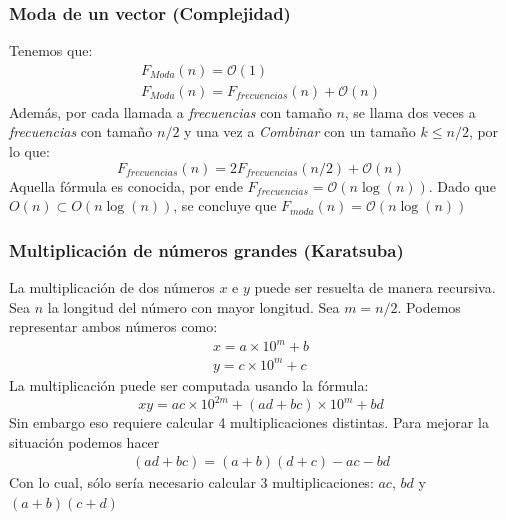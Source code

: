 \documentclass[10pt]{beamer}
\begin{document}
    \begin{frame}
        \frametitle{Moda de un vector (Complejidad)}
        Tenemos que:
        \begin{gather*}
            F_{Moda}(n) = \mathcal{O}(1) \\
            F_{Moda}(n) = F_{frecuencias}(n) + \mathcal{O}(n)
        \end{gather*}
        Además, por cada llamada a \textit{frecuencias} con tamaño $n$, 
        se llama dos veces a \textit{frecuencias} con tamaño $n/2$ y una vez a \textit{Combinar}
        con un tamaño $k \leq n/2$, por lo que:
        \begin{equation*}
            F_{frecuencias}(n) = 2F_{frecuencias}(n/2) + \mathcal{O}(n)
        \end{equation*}
        Aquella fórmula es conocida, por ende $F_{frecuencias} = \mathcal{O}(n\log(n))$. Dado que
        $O(n) \subset O(n\log(n))$, se concluye que $F_{moda}(n) = \mathcal{O}(n\log(n))$
    \end{frame}

    \begin{frame}
        \frametitle{Multiplicación de números grandes (Karatsuba)}
        La multiplicación de dos números $x$ e $y$ puede ser resuelta de manera recursiva. Sea $n$ la longitud del
        número con mayor longitud. Sea $m = n/2$. Podemos representar ambos números como:
        \begin{gather*}
            x = a \times 10^{m} + b\\
            y = c \times 10^{m} + c    
        \end{gather*}
        La multiplicación puede ser computada usando la fórmula:
        \begin{equation*}
            xy = ac \times 10^{2m} + (ad+bc) \times 10^m + bd   
        \end{equation*}
        Sin embargo eso requiere calcular 4 multiplicaciones distintas. Para mejorar la situación podemos hacer
        \begin{gather*}
            (ad+bc) = (a+b)(d+c) - ac - bd  
        \end{gather*}
        Con lo cual, sólo sería necesario calcular 3 multiplicaciones: $ac$, $bd$ y $(a+b)(c+d)$
    \end{frame}
\end{document}
